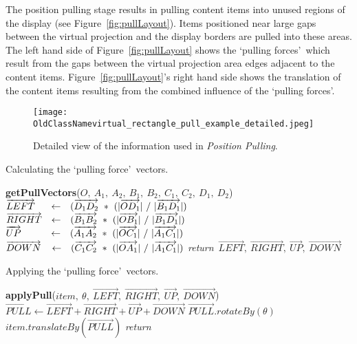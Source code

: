 \documentclass[review,5p,times,twocolumn]{elsarticle}
\newcommand{\INDSTATE}[1][1]{\STATE\hspace{#1\algorithmicindent}}
\begin{document}
The position pulling stage results in pulling content items into unused regions of the display (see
Figure~\ref{fig:pullLayout}).
Items positioned near large gaps between the virtual projection and the display borders are pulled into these areas.
The left hand side of Figure~\ref{fig:pullLayout} shows the \lq pulling forces\rq\ which result from the gaps between the virtual projection area edges adjacent to the content items.
Figure~\ref{fig:pullLayout}'s right hand side shows the translation of the content items resulting from the combined influence of the \lq pulling forces\rq .

\begin{figure}[h] 
 \centering
   \texttt{[image: OldClassNamevirtual\_rectangle\_pull\_example\_detailed.jpeg]}
   \caption{Detailed view of the information used in {\emph{Position Pulling}}.}
   \label{fig:pullLayoutExp}
\end{figure}

\begin{algorithm}[h]
\caption{Calculating the \lq pulling force\rq~vectors.}
\label{algo:pullLayoutOne}
\begin{algorithmic}
\STATE \textbf{getPullVectors}($O,\ A_{1},\ A_{2},\ B_{1},\ B_{2},\ C_{1},\ C_{2},\ D_{1},\ D_{2}$)
\INDSTATE[2]$\overrightarrow{LEFT}\hspace{0.5cm} \leftarrow \hspace{0.25cm}(\overrightarrow{D_{1}D_{2}}\ *\ ( |\overrightarrow{OD_{1}}|\  /\ |\overrightarrow{B_{1}D_{1}}| )$
\INDSTATE[2]$\overrightarrow{RIGHT}\hspace{0.25cm} \leftarrow \hspace{0.25cm}(\overrightarrow{B_{1}B_{2}}\ *\ ( |\overrightarrow{OB_{1}}|\  /\ |\overrightarrow{B_{1}D_{1}}| )$
\INDSTATE[2]$\overrightarrow{UP}\hspace{1cm} \leftarrow \hspace{0.25cm}(\overrightarrow{A_{1}A_{2}}\ *\ ( |\overrightarrow{OC_{1}}|\  /\ |\overrightarrow{A_{1}C_{1}}| )$
\INDSTATE[2]$\overrightarrow{DOWN}\hspace{0.3cm} \leftarrow \hspace{0.25cm}(\overrightarrow{C_{1}C_{2}}\ *\ ( |\overrightarrow{OA_{1}}|\  /\ |\overrightarrow{A_{1}C_{1}}| )$
\STATE \textit{return}\ $\overrightarrow{LEFT},\ \overrightarrow{RIGHT},\ \overrightarrow{UP},\ \overrightarrow{DOWN}$
\end{algorithmic}
\end{algorithm}

\begin{algorithm}[h!]
\caption{Applying the \lq pulling force\rq~vectors.}
\label{algo:pullLayoutTwo}
\begin{algorithmic}
\STATE \textbf{applyPull}($item,\ \theta,\ \overrightarrow{LEFT},\ \overrightarrow{RIGHT},\ \overrightarrow{UP},\ \overrightarrow{DOWN}$)
\INDSTATE[2]$\overrightarrow{PULL} \leftarrow \overrightarrow{LEFT} + \overrightarrow{RIGHT} + \overrightarrow{UP} + \overrightarrow{DOWN}$
\INDSTATE[2]$\overrightarrow{PULL}.rotateBy(\theta)$
\INDSTATE[2]$item.translateBy(\overrightarrow{PULL})$
\STATE \textit{return}
\end{algorithmic}
\end{algorithm}
\end{document}
